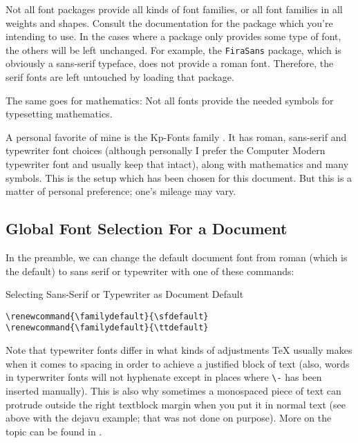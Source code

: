 \documentclass[a4paper,oneside,11pt]{article}
\newcommand\code[1]{\texttt{#1}}
\begin{document}
Not all font packages provide all kinds of font families, or all font families
in all  weights and  shapes. Consult the documentation  for the  package which
you're intending to use. In the cases  where a package only provides some type
of font, the  others will be left unchanged. For  example, the \code{FiraSans}
package, which  is obviously a sans-serif  typeface, does not provide  a roman
font. Therefore, the serif fonts are left untouched by loading that package.

The same  goes for mathematics: Not all  fonts provide the needed  symbols for
typesetting mathematics.

A personal  favorite of mine  is the Kp-Fonts family  \cite{ctan:kpfonts}.  It
has  roman, sans-serif  and  typewriter font  choices  (although personally  I
prefer  the Computer  Modern typewriter  font and  usually keep  that intact),
along with  mathematics and  many symbols. This  is the  setup which  has been
chosen for this  document. But this is a matter of  personal preference; one's
mileage may vary.


\subsection{Global Font Selection For a Document}
\label{subsec:fontsel:global}


In the preamble, we can change the  default document font from roman (which is
the default) to sans serif or typewriter with one of these commands:

\begin{titled-frame}
{\textsf{Selecting Sans-Serif or Typewriter as Document Default}}
\vspace{-1em}
\begin{verbatim}
\renewcommand{\familydefault}{\sfdefault}
\renewcommand{\familydefault}{\ttdefault}
\end{verbatim}
\vspace{-1em}
\end{titled-frame}

Note that typewriter fonts differ in  what kinds of adjustments \TeX{} usually
makes when it comes  to spacing in order to achieve a  justified block of text
(also,  words  in  typerwriter  fonts  will not  hyphenate  except  in  places
where    \code{\textbackslash{}-}  has been  inserted manually). This  is also
why  sometimes a  monospaced  piece of  text can  protrude  outside the  right
textblock margin  when you put  it in normal text  (see above with  the dejavu
example; that  was not  done on purpose). More  on the topic  can be  found in
\cite{texblog:typewriter}.
\end{document}
